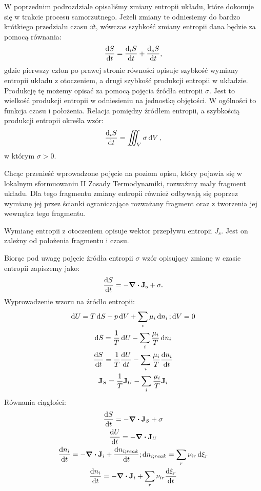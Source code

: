 \documentclass[10pt, a4paper, twoside, onecolumn]{article}
\numberwithin{equation}{section}
\begin{document}
	W poprzednim podrozdziale opisaliśmy zmiany entropii układu, które dokonuje się w trakcie procesu samorzutnego. Jeżeli zmiany te odniesiemy do bardzo krótkiego przedziału czasu \(\dd{t}\), wówczas szybkość zmiany entropii dana będzie za pomocą równania:
	\begin{equation}
		\dv{S}{t} = \dv{_{i}S}{t} + \dv{_{e}S}{t},
	\end{equation}
	gdzie pierwszy człon po prawej stronie równości opisuje szybkość wymiany entropii układu z otoczeniem, a drugi szybkość produkcji entropii w układzie. Produkcję tę możemy opisać za pomocą pojęcia źródła entropii \(\sigma\). Jest to wielkość produkcji entropii w odniesieniu na jednostkę objętości. W ogólności to funkcja czasu i położenia. Relacja pomiędzy źródłem entropii, a szybkością produkcji entropii określa wzór:
	\begin{equation}
		\dv{_{i}S}{t} = \iiint_{V}\sigma\dd{V},
	\end{equation}
	w którym \(\sigma>0\). \par
	Chcąc przenieść wprowadzone pojęcie na poziom opisu, który pojawia się w lokalnym sformuowaniu II Zasady Termodynamiki, rozważmy mały fragment układu. Dla tego fragmentu zmiany entropii również odbywają się poprzez wymianę jej przez ścianki ograniczające rozważany fragment oraz z tworzenia jej wewnątrz tego fragmentu. \par
	Wymianę entropii z otoczeniem opisuje wektor przepływu entropii \(J_{s}\). Jest on zależny od położenia fragmentu i czasu. \par
	Biorąc pod uwagę pojęcie źródła entropii \(\sigma\) wzór opisujący zmianę w czasie entropii zapiszemy jako:
	\begin{equation}
		\dv{S}{t} = -\div{\vb{J_{s}}} + \sigma.
	\end{equation}
	Wyprowadzenie wzoru na źródło entropii:
	\begin{gather}
		\dd{U}=T\dd{S}-p\dd{V}+\sum_{i}\mu_{i}\dd{n_{i}}; \dd{V}=0 \label{dod A: 1} \\
		\dd{S}=\frac{1}{T}\dd{U}-\sum_{i}\frac{\mu_{i}}{T}\dd{n_{i}} \label{dod A: 2} \\
		\dv{S}{t}=\frac{1}{T}\dv{U}{t}-\sum_{i}\frac{\mu_{i}}{T}\dv{n_{i}}{t} \label{dod A: 3} \\
		\vb{J}_{S}=\frac{1}{T}\vb{J}_{U}-\sum_{i}\frac{\mu_{i}}{T}\vb{J}_{i} \label{dod A: 4}
	\end{gather}
	Równania ciągłości:
	\begin{gather}
		\dv{S}{t}=-\div{\vb{J}_{S}}+\sigma \label{dod A: 5} \\
		\dv{U}{t}=-\div{\vb{J}_{U}} \label{dod A: 6} \\
		\dv{n_{i}}{t}=-\div{\vb{J}_{i}}+\dv{n_{i;reak}}{t}; \dd{n_{i;reak}}=\sum_{r}\nu_{ir}\dd{\xi_{r}} \label{dod A: 7} \\
		\dv{n_{i}}{t}=-\div{\vb{J}_{i}}+\sum_{r}\nu_{ir}\dv{\xi_{r}}{t} \label{dod A: 8}
	\end{gather}
\end{document}
